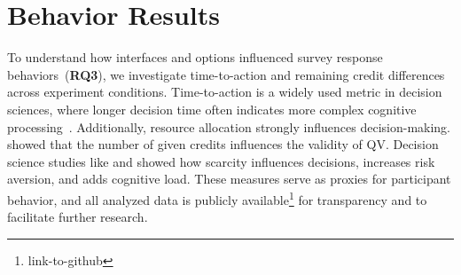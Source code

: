 \section{Behavior Results}
\label{sec:behave_result}
To understand how interfaces and options influenced survey response behaviors~(\textbf{RQ3}), we investigate time-to-action and remaining credit differences across experiment conditions. Time-to-action is a widely used metric in decision sciences, where longer decision time often indicates more complex cognitive processing~\cite{payneAdaptiveDecisionMaker1993}. Additionally, resource allocation strongly influences decision-making. \textcite{chengCanShowWhat2021} showed that the number of given credits influences the validity of QV. Decision science studies like \textcite{Shah2015a} and \cite{debruijnPovertyEconomicDecision2022} showed how scarcity influences decisions, increases risk aversion, and adds cognitive load. These measures serve as proxies for participant behavior, and all analyzed data is publicly available\footnote{link-to-github} for transparency and to facilitate further research.

\newsavebox{\savefig}

